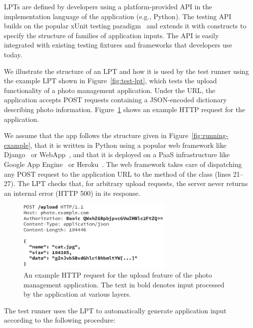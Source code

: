  LPTs are defined by developers using a platform-provided API in the implementation language of the application (e.g., Python).  The testing API builds on the popular xUnit testing paradigm~\cite{xunit} and extends it with constructs to specify the structure of families of application inputs.  The API is easily integrated with existing testing fixtures and frameworks that developers use today.

We illustrate the structure of an LPT and how it is used by the test runner using the example LPT  shown in Figure~\ref{fig:test-lpt}, which tests the upload functionality of a photo management application.  Under the  URL, the application accepts POST requests containing a JSON-encoded dictionary describing photo information.  Figure~\ref{fig:http-packet} shows an example HTTP request for the application.

We assume that the app follows the structure given in Figure~\ref{fig:running-example}, that it is written in Python using a popular web framework like Django~\cite{py-django} or WebApp~\cite{webapp2}, and that it is deployed on a PaaS infrastructure like Google App Engine~\cite{google-gae} or Heroku~\cite{heroku}.  The web framework takes care of dispatching any POST request to the  application URL to the  method of the  class (lines 21--27).
%
The  LPT checks that, for arbitrary upload requests, the server never returns an internal error (HTTP 500) in its response.

\begin{figure}
  \centering
  \includegraphics[width=3in]{paas/figures/http-packet}
  \caption{An example HTTP request for the upload feature of the photo
    management application.  The text in bold denotes input processed
    by the application at various layers.}
  \label{fig:http-packet}
\end{figure}

The test runner uses the LPT to automatically generate application
input according to the following procedure:

